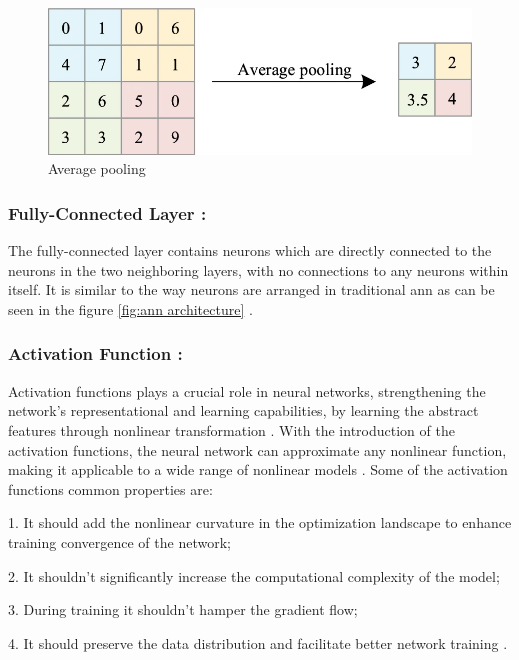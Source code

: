 \begin{figure}[H]
    \centering
    \includegraphics[width=1\linewidth]{Rohit_Master_Thesis//Images/average_pooling.png}
    \caption{Average pooling \cite{Zhao2024}}
    \label{fig:average pooling}
\end{figure}

\subsubsection*{Fully-Connected Layer :}

The fully-connected layer contains neurons which are directly connected to the neurons in the two neighboring layers, with no connections to any neurons within itself. It is similar to the way neurons are arranged in traditional \gls{ann} as can be seen in the figure \ref{fig:ann architecture} \cite{oshea2015introductionconvolutionalneuralnetworks}.

\subsubsection*{Activation Function :}

Activation functions plays a crucial role in neural networks, strengthening the network's representational and learning capabilities, by learning the abstract features through nonlinear transformation \cite{dubey2022activationfunctionsdeeplearning}. With the introduction of the activation functions, the neural network can approximate any nonlinear function, making it applicable to a wide range of nonlinear models \cite{Zhao2024}. Some of the activation functions common properties are:

1. It should add the nonlinear curvature in the optimization landscape to enhance training convergence of the network;

2. It shouldn't significantly increase the computational complexity of the model;

3. During training it shouldn't hamper the gradient flow;

4. It should preserve the data distribution and facilitate better network training \cite{dubey2022activationfunctionsdeeplearning}.

